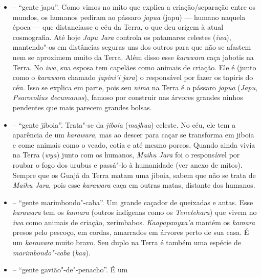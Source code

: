 \begin{itemize}
  crepúsculo. As marcas vermelhas que eventualmente aparecem no céu
  durante o pôr"-do"-sol são a trilha feita por
  \emph{Takwariroxa'a}, e é por ela que os \emph{karawara}
  passam levando água da Terra para os patamares celestes. O duplo
  terrestre desse \emph{karawara} são as folhas de uma taquara chamada
  \emph{takwari ruy}.
\item
   -- ``gente japu''. Como vimos no mito
  que explica a criação/separação entre os mundos, os humanos pediram ao
  pássaro \emph{japua} (japu) --- humano naquela época --- que distanciasse
  o céu da Terra, o que deu origem à atual cosmografia. Até hoje
  \emph{Japu} \emph{Jara} controla os patamares
  celestes (\emph{iwa}), mantendo"-os em distâncias seguras uns dos
  outros para que não se afastem nem se aproximem muito da Terra. Além
  disso esse \emph{karawara} caça jabotis na Terra. No \emph{iwa}, sua
  esposa tem capelães como animais de criação. Ele é (junto como o
  \emph{karawara} chamado \emph{japini'i jara}) o responsável por fazer
  os tapiris do céu. Isso se explica em parte, pois seu \emph{nima} na
  Terra é o pássaro \emph{japua} (\emph{Japu}, \emph{Psarocolius
  decumanus}), famoso por construir nas árvores grandes ninhos pendentes
  que mais parecem grandes bolsas.
\item
  \emph{} -- ``gente jiboia''. Trata"-se da
  \emph{jiboia} (\emph{majhua}) celeste. No céu, ele tem a aparência
  de um \emph{karawara}, mas ao descer para caçar se transforma em
  jiboia e come animais como o veado, cotia e até mesmo porcos. Quando
  ainda vivia na Terra (\emph{wya}) junto com os humanos,
  \emph{Maihu Jara} foi o responsável por roubar o fogo dos
  urubus e passá"-lo à humanidade (ver anexo de mitos). Sempre que os
  Guajá da Terra matam uma jiboia, sabem que não se trata de
  \emph{Maihu Jara}, pois esse \emph{karawara} caça em outras
  matas, distante dos humanos.
\item
  \emph{} -- ``gente marimbondo"-caba''. Um grande
  caçador de queixadas e antas. Esse \emph{karawara} tem os
  \emph{kamara} (outros indígenas como os \emph{Tenetehara}) que vivem
  no \emph{iwa} como animais de criação, xerimbabos.
  \emph{Kaapapanyxa'a} mantém os \emph{kamara} presos pelo
  pescoço, em cordas, amarrados em árvores perto de sua casa. É um
  \emph{karawara} muito bravo. Seu duplo na Terra é também uma espécie
  de \emph{marimbondo"-caba} (\emph{kaa}).
\item
   -- ``gente gavião"-de"-penacho''. É um

\end{itemize}

